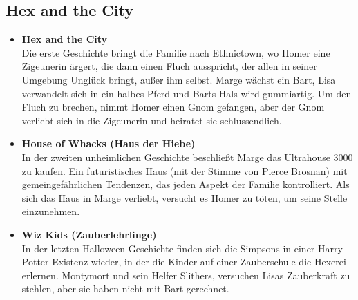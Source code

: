 \subsection{Hex and the City}\label{CABF19}
\begin{itemize}
	\item \textbf{Hex and the City}\\ Die erste Geschichte bringt die Familie nach \glqq Ethnictown\grqq , wo Homer eine Zigeunerin ärgert, die dann einen Fluch ausspricht, der allen in seiner Umgebung Unglück bringt, außer ihm selbst. Marge wächst ein Bart, Lisa verwandelt sich in ein halbes Pferd und Barts Hals wird gummiartig. Um den Fluch zu brechen, nimmt Homer einen Gnom gefangen, aber der Gnom verliebt sich in die Zigeunerin und heiratet sie schlussendlich.
	\item \textbf{House of Whacks (Haus der Hiebe)}\\ In der zweiten unheimlichen Geschichte beschließt Marge das Ultrahouse 3000 zu kaufen. Ein futuristisches Haus (mit der Stimme von Pierce Brosnan) mit gemeingefährlichen Tendenzen, das jeden Aspekt der Familie kontrolliert. Als sich das Haus in Marge verliebt, versucht es Homer zu töten, um seine Stelle einzunehmen.
	\item \textbf{Wiz Kids (Zauberlehrlinge)}\\ In der letzten Halloween-Geschichte finden sich die Simpsons in einer Harry Potter Existenz wieder, in der die Kinder auf einer Zauberschule die Hexerei erlernen. Montymort und sein Helfer Slithers, versuchen Lisas Zauberkraft zu stehlen, aber sie haben nicht mit Bart gerechnet.
\end{itemize}
  
  

